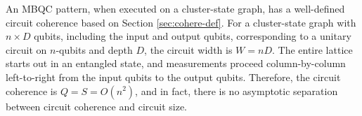 An MBQC pattern, when executed on a cluster-state graph, has a well-defined
circuit coherence based on Section \ref{sec:cohere-def}. For a cluster-state
graph with $n \times D$ qubits, including the input and output qubits,
corresponding to a unitary circuit on $n$-qubits
and depth $D$, the circuit width is $W = nD$. The entire lattice starts out
in an entangled state, and measurements proceed column-by-column
left-to-right from the input qubits to the output qubits. Therefore,
the circuit coherence is $Q = S = O(n^2)$, and in fact, there is no
asymptotic separation between circuit coherence and circuit size.